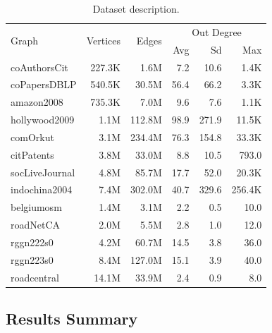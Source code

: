 \begin{table}[tbp]
\caption{Dataset description.} 
\begin{center}
    \begin{tabular}{|l|r|r|r|r|r|}
    \hline
    \multirow{2}{*}{Graph} & \multirow{2}{*}{Vertices} & \multirow{2}{*}{Edges} & \multicolumn{3}{c|}{Out Degree} \\ 
    \cline{4-6} & & & \multicolumn{1}{r|}{Avg} & \multicolumn{1}{r|}{Sd} & \multicolumn{1}{r|}{Max} \\
    \hline
    \hline
    \rowcolor{black!10} coAuthorsCit&227.3K&1.6M&7.2&10.6&1.4K\\
    \rowcolor{black!2 } coPapersDBLP&540.5K&30.5M&56.4&66.2&3.3K\\
    \rowcolor{black!10} amazon2008&735.3K&7.0M&9.6&7.6&1.1K\\
    \rowcolor{black!2 } hollywood2009&1.1M&112.8M&98.9&271.9&11.5K\\
    \rowcolor{black!10} comOrkut&3.1M&234.4M&76.3&154.8&33.3K\\
    \rowcolor{black!2 } citPatents&3.8M&33.0M&8.8&10.5&793.0\\
    \rowcolor{black!10} socLiveJournal&4.8M&85.7M&17.7&52.0&20.3K\\
    \rowcolor{black!2 } indochina2004&7.4M&302.0M&40.7&329.6&256.4K\\
    \hline
    \rowcolor{black!10} belgiumosm&1.4M&3.1M&2.2&0.5&10.0\\
    \rowcolor{black!2 } roadNetCA&2.0M&5.5M&2.8&1.0&12.0\\
    \rowcolor{black!10} rggn222s0&4.2M&60.7M&14.5&3.8&36.0\\
    \rowcolor{black!2 } rggn223s0&8.4M&127.0M&15.1&3.9&40.0\\
    \rowcolor{black!10} roadcentral&14.1M&33.9M&2.4&0.9&8.0\\
    \hline
    \end{tabular}
    \label{dataset:info}
\end{center}
\end{table}

\subsection{Results Summary}

